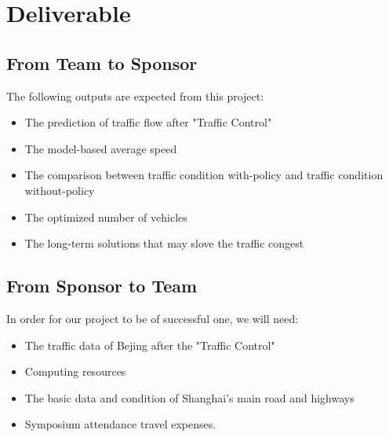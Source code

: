 \documentclass[12pt,letterpaper]{article}
\theoremstyle{definition}
\begin{document}
\section{Deliverable}
\subsection{From Team to Sponsor} %
The following outputs are expected from this project:
\begin{itemize}
    \item The prediction of traffic flow after "Traffic Control" 
    \item The model-based average speed
    \item The comparison between traffic condition with-policy and traffic condition without-policy
    \item The optimized number of vehicles 
    \item The long-term solutions that may slove the traffic congest
\end{itemize}

\subsection{From Sponsor to Team} %

In order for our project to be of successful one, we will need:
\begin{itemize}
    \item The traffic data of Bejing after the "Traffic Control"
    \item Computing resources
    \item The basic data and condition of Shanghai's main road and highways 
    \item Symposium attendance travel expenses.
\end{itemize}


%
%
\end{document}
